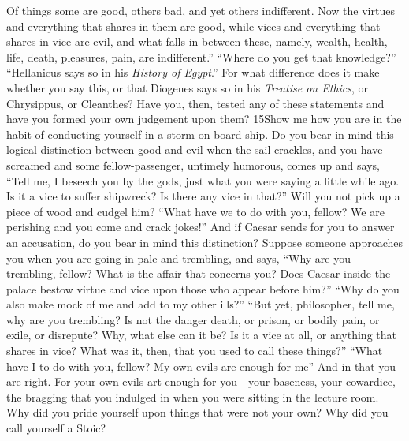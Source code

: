 Of things some are good, others bad, and yet others indifferent. Now the virtues and everything that shares in them are good, while vices and everything that shares in vice are evil, and what falls in between these, namely, wealth, health, life, death, pleasures, pain, are indifferent.'' ``Where do you get that knowledge?'' ``Hellanicus says so in his \emph{History of Egypt}.'' For what difference does it make whether you say this, or that Diogenes says so in his \emph{Treatise on Ethics}, or Chrysippus, or Cleanthes? Have you, then, tested any of these statements and have you formed your own judgement upon them? 15Show me how you are in the habit of conducting yourself in a storm on board ship. Do you bear in mind this logical distinction between good and evil when the sail crackles, and you have screamed and some fellow-passenger, untimely humorous, comes up and says, ``Tell me, I beseech you by the gods, just what you were saying a little while ago. Is it a vice to suffer shipwreck? Is there any vice in that?'' Will you not pick up a piece of wood and cudgel him? ``What have we to do with you, fellow? We are perishing and you come and crack jokes!'' And if Caesar sends for you to answer an accusation, do you bear in mind this distinction? Suppose someone approaches you when you are going in pale and trembling, and says, ``Why are you trembling, fellow? What is the affair that concerns you? Does Caesar inside the palace bestow virtue and vice upon those who appear before him?'' ``Why do you also make mock of me and add to my other ills?'' ``But yet, philosopher, tell me, why are you trembling? Is not the danger death, or prison, or bodily pain, or exile, or disrepute? Why, what else can it be? Is it a vice at all, or anything that shares in vice? What was it, then, that you used to call these things?'' ``What have I to do with you, fellow? My own evils are enough for me'' And in that you are right. For your own evils art enough for you—your baseness, your cowardice, the bragging that you indulged in when you were sitting in the lecture room. Why did you pride yourself upon things that were not your own? Why did you call yourself a Stoic?

